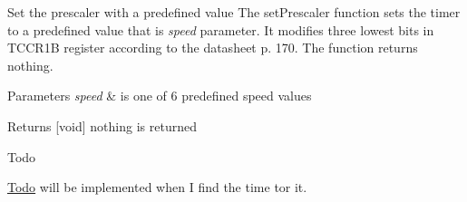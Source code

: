 Set the prescaler with a predefined value The set\+Prescaler function sets the timer to a predefined value that is {\itshape speed} parameter. It modifies three lowest bits in T\+C\+C\+R1\+B register according to the datasheet p. 170. The function returns nothing. 


\begin{DoxyParams}{Parameters}
{\em speed} & is one of 6 predefined speed values \\
\hline
\end{DoxyParams}
\begin{DoxyReturn}{Returns}
\mbox{[}void\mbox{]} nothing is returned 
\end{DoxyReturn}
\begin{DoxyRefDesc}{Todo}
\item[\hyperlink{todo__todo000001}{Todo}]will be implemented when I find the time tor it. \end{DoxyRefDesc}
